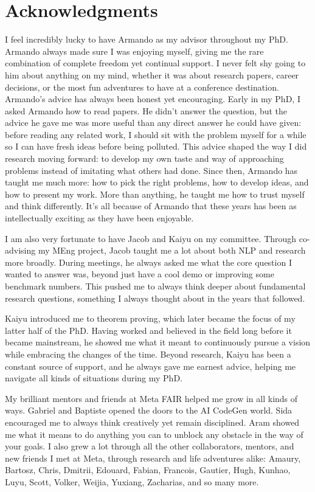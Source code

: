\chapter*{Acknowledgments}

I feel incredibly lucky to have Armando as my advisor throughout my PhD. Armando always made sure I was enjoying myself, giving me the rare combination of complete freedom yet continual support. I never felt shy going to him about anything on my mind, whether it was about research papers, career decisions, or the most fun adventures to have at a conference destination. Armando's advice has always been honest yet encouraging. Early in my PhD, I asked Armando how to read papers. He didn't answer the question, but the advice he gave me was more useful than any direct answer he could have given: before reading any related work, I should sit with the problem myself for a while so I can have fresh ideas before being polluted. This advice shaped the way I did research moving forward: to develop my own taste and way of approaching problems instead of imitating what others had done. Since then, Armando has taught me much more: how to pick the right problems, how to develop ideas, and how to present my work. More than anything, he taught me how to trust myself and think differently. It's all because of Armando that these years has been as intellectually exciting as they have been enjoyable.

I am also very fortunate to have Jacob and Kaiyu on my committee. Through co-advising my MEng project, Jacob taught me a lot about both NLP and research more broadly. During meetings, he always asked me what the core question I wanted to answer was, beyond just have a cool demo or improving some benchmark numbers. This pushed me to always think deeper about fundamental research questions, something I always thought about in the years that followed.

Kaiyu introduced me to theorem proving, which later became the focus of my latter half of the PhD. Having worked and believed in the field long before it became mainstream, he showed me what it meant to continuously pursue a vision while embracing the changes of the time. Beyond research, Kaiyu has been a constant source of support, and he always gave me earnest advice, helping me navigate all kinds of situations during my PhD.

My brilliant mentors and friends at Meta FAIR helped me grow in all kinds of ways. Gabriel and Baptiste opened the doors to the AI CodeGen world. Sida encouraged me to always think creatively yet remain disciplined. Aram showed me what it means to do anything you can to unblock any obstacle in the way of your goals. I also grew a lot through all the other collaborators, mentors, and new friends I met at Meta, through research and life adventures alike: Amaury, Bartosz, Chris, Dmitrii, Edouard, Fabian, Francois, Gautier, Hugh, Kunhao, Luyu, Scott, Volker, Weijia, Yuxiang, Zacharias, and so many more.


